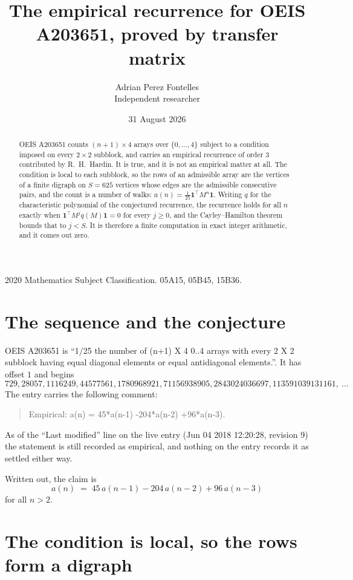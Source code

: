 \documentclass[11pt,a4paper]{article}
\title{The empirical recurrence for OEIS A203651, proved by transfer matrix}
\author{Adrian Perez Fontelles\\ \small Independent researcher}
\date{31 August 2026}
\theoremstyle{plain}
\theoremstyle{definition}
\begin{document}
\maketitle

\begin{abstract}
OEIS A203651 counts $(n+1)\times4$ arrays over $\{0,\dots,4\}$ subject to a condition imposed on
every $2\times2$ subblock, and carries an empirical recurrence of order $3$ contributed
by R.~H.~Hardin. It is true, and it is not an empirical matter at all. The condition is local
to each subblock, so the rows of an admissible array are the vertices of a finite digraph
on $S=625$ vertices whose edges are the admissible consecutive pairs, and the count is a
number of walks: $a(n)=\tfrac1{25}\mathbf{1}^{\!\top}M^{n}\mathbf{1}$. Writing $q$
for the characteristic polynomial of the conjectured recurrence, the recurrence holds for all
$n$ exactly when $\mathbf{1}^{\!\top}M^{j}q(M)\mathbf{1}=0$ for every $j\ge0$, and the
Cayley--Hamilton theorem bounds that to $j<S$. It is therefore a finite computation in exact
integer arithmetic, and it comes out zero.
\end{abstract}

\noindent\small 2020 Mathematics Subject Classification. 05A15, 05B45, 15B36.\normalsize

\section{The sequence and the conjecture}

OEIS A203651 is ``1/25 the number of (n+1) X 4 0..4 arrays with every 2 X 2 subblock having equal diagonal elements or equal antidiagonal elements.''. It has offset $1$ and begins
\[
729, 28057, 1116249, 44577561, 1780968921, 71156938905, 2843024036697, 113591039131161,\ \dots
\]
The entry carries the following comment:
\begin{quote}\small
Empirical: a(n) = 45*a(n-1) -204*a(n-2) +96*a(n-3).
\end{quote}
As of the ``Last modified'' line on the live entry (Jun 04 2018 12:20:28, revision 9) the statement is
still recorded as empirical, and nothing on the entry records it as settled either way.

Written out, the claim is
\begin{equation}\label{eq:conj}
a(n)\;=\;45\,a(n-1) - 204\,a(n-2) + 96\,a(n-3)
\end{equation}
for all $n>2$.

\section{The condition is local, so the rows form a digraph}
\end{document}
